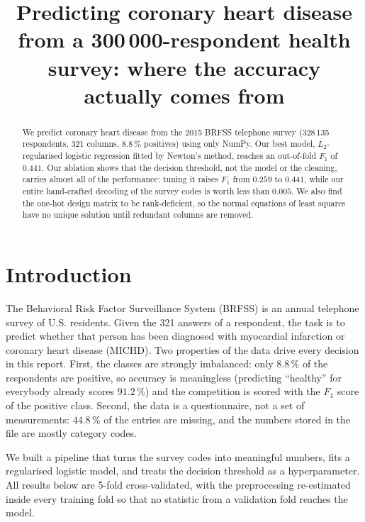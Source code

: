 \documentclass[10pt,conference,compsocconf]{IEEEtran}
\begin{document}
\title{Predicting coronary heart disease from a 300\,000-respondent health
survey: where the accuracy actually comes from}

\author{
}

\maketitle

\begin{abstract}
We predict coronary heart disease from the 2015 BRFSS telephone survey
(328\,135 respondents, 321 columns, 8.8\,\% positives) using only NumPy. Our
best model, $L_2$-regularised logistic regression fitted by Newton's method,
reaches an out-of-fold $F_1$ of $0.441$. Our ablation shows that the decision
threshold, not the model or the cleaning, carries almost all of the
performance: tuning it raises $F_1$ from $0.259$ to $0.441$, while our entire
hand-crafted decoding of the survey codes is worth less than $0.005$. We also
find the one-hot design matrix to be rank-deficient, so the normal equations of
least squares have no unique solution until redundant columns are removed.
\end{abstract}

\section{Introduction}

The Behavioral Risk Factor Surveillance System (BRFSS) is an annual telephone
survey of U.S. residents. Given the 321 answers of a respondent, the task is to
predict whether that person has been diagnosed with myocardial infarction or
coronary heart disease (MICHD). Two properties of the data drive every decision
in this report. First, the classes are strongly imbalanced: only $8.8\,\%$ of
the respondents are positive, so accuracy is meaningless (predicting
``healthy'' for everybody already scores $91.2\,\%$) and the competition is
scored with the $F_1$ score of the positive class. Second, the data is a
questionnaire, not a set of measurements: $44.8\,\%$ of the entries are
missing, and the numbers stored in the file are mostly category codes.

We built a pipeline that turns the survey codes into meaningful numbers, fits a
regularised logistic model, and treats the decision threshold as a
hyperparameter. All results below are 5-fold cross-validated, with the
preprocessing re-estimated inside every training fold so that no statistic from
a validation fold reaches the model.
\end{document}
